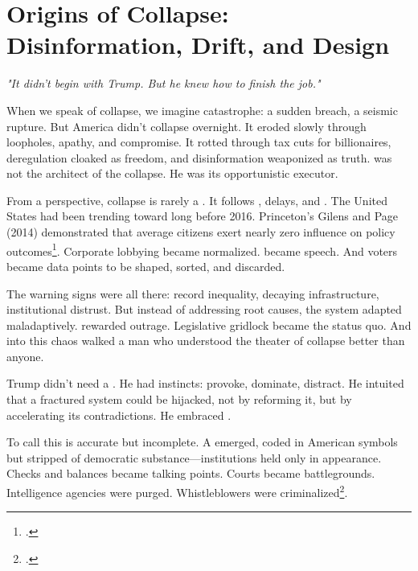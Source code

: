 
\chapter{Origins of Collapse: Disinformation, Drift, and Design}

\textit{"It didn't begin with Trump. But he knew how to finish the job."}

When we speak of collapse, we imagine catastrophe: a sudden breach, a seismic rupture. But America didn't collapse overnight. It eroded slowly through loopholes, apathy, and compromise. It rotted through tax cuts for billionaires, deregulation cloaked as freedom, and disinformation weaponized as truth.  was not the architect of the collapse. He was its opportunistic executor.

From a  perspective, collapse is rarely a . It follows , delays, and . The United States had been trending toward  long before 2016. Princeton's Gilens and Page (2014) demonstrated that average citizens exert nearly zero influence on policy outcomes\footcite{gilens2014testing}. Corporate lobbying became normalized.  became speech. And voters became data points to be shaped, sorted, and discarded.

The warning signs were all there: record inequality, decaying infrastructure, institutional distrust. But instead of addressing root causes, the system adapted maladaptively.  rewarded outrage. Legislative gridlock became the status quo. And into this chaos walked a man who understood the theater of collapse better than anyone.

Trump didn't need a . He had instincts: provoke, dominate, distract. He intuited that a fractured system could be hijacked, not by reforming it, but by accelerating its contradictions. He embraced .

To call this  is accurate but incomplete. A  emerged, coded in American symbols but stripped of democratic substance—institutions held only in appearance. Checks and balances became talking points. Courts became battlegrounds. Intelligence agencies were purged. Whistleblowers were criminalized\footcite{gellman2020dark}.

